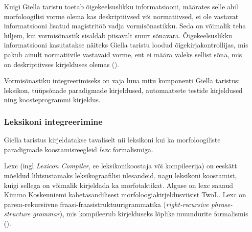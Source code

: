 \documentclass[12pt,a4paper]{article}
\begin{document}
Kuigi Giella taristu toetab õige\-keelsuslikku informatsiooni, määrates selle abil morfoloogilisi vorme olema kas deskriptiivsed või normatiivsed, ei ole vastavat informatsiooni lisatud magistritöö vadja vormi\-sõnastikku. Seda on võimalik teha hiljem, kui vormi\-sõnastik sisaldab piisavalt suurt sõna\-vara. Õige\-keelsuslikku informatsiooni kasutatakse näiteks Giella taristu loodud õige\-kirja\-kontrollijas, mis pakub ainult normatiivile vastavaid vorme, ent ei määra valeks sellist sõna, mis on deskriptiivses kirjelduses olemas (\cite{moshagen_building_2013}). %

Vormisõnastiku integreerimiseks on vaja luua mitu komponenti Giella taristus: leksikon, tüüpsõnade paradigmade kirjeldused, automaatsete testide kirjeldused ning kooste\-programmi kirjeldus. 





\subsubsection{Leksikoni integreerimine}
\label{sec:giella-leksikon}


Giella taristus kirjeldatakse tavaliselt nii leksikoni kui ka morfoloogiliste paradigmade koostamis\-reegleid \textit{lexc} formalismiga.

Lexc (ingl \textit{Lexicon Compiler}, ee leksikoni\-koostaja või kompileerija) on eeskätt mõeldud lihtsustamaks leksikograafilisi ülesandeid, nagu leksikoni koostamist, kuigi sellega on võimalik kirjeldada ka morfotaktikat. 
Alguse on lexc saanud Kimmo Koskenniemi kahetasandilisest morfoloogia\-kirjeldus\-viisist TwoL. 
Lexc on parem-rekursiivne fraasi-fraasi\-struktuuri\-grammatika (\textit{right-recursive phrase-structure grammar}), mis kompileerub kirjelduseks lõplike muundurite formalismis (\cites[]{karttunen_finite-state_1993}[203]{beesley_finite_2003}). 
\end{document}
